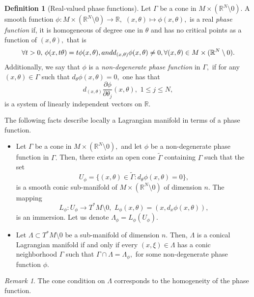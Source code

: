 \documentclass[12pt, reqno]{amsart}
\theoremstyle{definition}
\newtheorem{definition}[theorem]{Definition}
\theoremstyle{remark}
\newtheorem{remark}[theorem]{Remark}
\numberwithin{equation}{section}
\begin{document}
\begin{definition}[Real-valued phase functions]\label{Real:defin} Let $\Gamma$ be a cone in $M\times (\mathbb{R}^N\setminus 0). $ A smooth function $\phi:M\times (\mathbb{R}^N\setminus 0)\rightarrow \mathbb{R}, $ $(x,\theta)\mapsto \phi(x,\theta),$ is a real {\it phase function} if, it is homogeneous of degree one in $\theta$ and has no critical points as a function of $(x,\theta),$ that is 
\begin{equation}
 \forall t>0,\,   \phi(x,t\theta)=t\phi(x,\theta), \textnormal{   and   }d_{(x,\theta)}\phi(x,\theta)\neq 0,\forall (x,\theta)\in M\times (\mathbb{R}^N\setminus 0).
\end{equation}Additionally, we say that $\phi$ is a  {\it non-degenerate phase function} in $\Gamma,$ if for any $(x,\theta)\in \Gamma$ such that $d_{\theta}\phi(x,\theta)=0,$ one has that 
\begin{equation}
    d_{(x,\theta)}\frac{\partial \phi}{\partial\theta_{j}}(x,\theta),\,\,1\leq j\leq N,
\end{equation}is a system of linearly independent vectors on $\mathbb{R}$.
\end{definition}
The following facts describe locally a Lagrangian manifold in terms of a phase function.
\begin{itemize}
    \item Let $\Gamma$ be a cone in $M\times (\mathbb{R}^N\setminus 0), $ and let $\phi$ be a non-degenerate phase function in $\Gamma.$ Then, there exists an open cone $\tilde{\Gamma}$ containing $\Gamma$ such that the set
    \begin{equation}
        U_{\phi}=\{(x,\theta)\in \tilde{\Gamma}:d_\theta \phi(x,\theta)=0\},
    \end{equation}is a smooth conic  sub-manifold of $M\times (\mathbb{R}^N\setminus 0)$ of dimension $n.$ The mapping 
    \begin{equation}
        L_{\phi}: U_\phi\rightarrow T^*M\setminus 0,\,\, L_{\phi}(x,\theta)=(x,d_x\phi(x,\theta)),
    \end{equation}is an immersion. Let us denote $\Lambda_\phi=L_{\phi}(U_\phi).$
    \item Let $\Lambda\subset T^*M\setminus 0$ be a sub-manifold of dimension $n.$ Then,  $\Lambda$ is a conical Lagrangian manifold if and only if  every $(x,\xi)\in \Lambda$ has a conic neighborhood $\Gamma$ such that $\Gamma\cap \Lambda=\Lambda_\phi, $ for some non-degenerate phase function $\phi.$ 
\end{itemize}
\begin{remark}
The cone condition on $\Lambda$ corresponds to the homogeneity of the phase function.
\end{remark}
\end{document}
